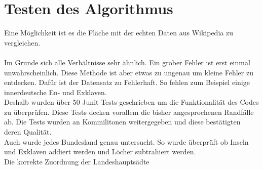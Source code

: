 \documentclass[conference]{IEEEtran}
\begin{document}
	\section{Testen des Algorithmus}
	Eine Möglichkeit ist es die Fläche mit der echten Daten aus Wikipedia zu vergleichen.\\
	\vspace{0.2cm}
	\\
	Im Grunde sich alle Verhältnisse sehr ähnlich. Ein grober Fehler ist erst einmal unwahrscheinlich. Diese Methode ist aber etwas zu ungenau um kleine Fehler zu entdecken. Dafür ist der Datensatz zu Fehlerhaft. So fehlen zum Beispiel einige innerdeutsche En- und Exklaven.\\
	Deshalb wurden über 50 Junit Tests geschrieben um die Funktionalität des Codes zu überprüfen. Diese Tests decken vorallem die bisher angesprochenen Randfälle ab. Die Tests wurden an Kommilitonen weitergegeben und diese bestätigten deren Qualität.\\
	Auch wurde jedes Bundesland genau untersucht. So wurde überprüft ob Inseln und Exklaven addiert werden und Löcher subtrahiert werden.\\
	Die korrekte Zuordnung der Landeshauptsädte
	
\end{document}

